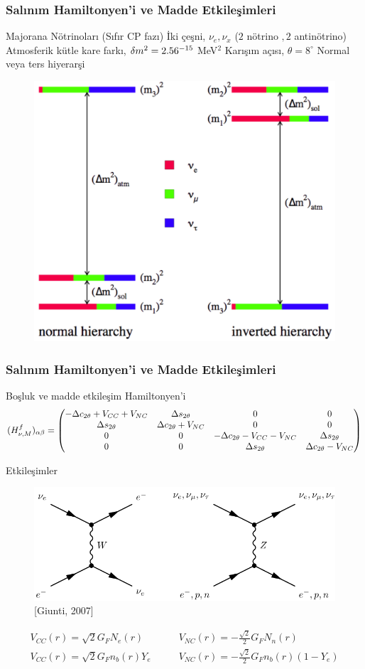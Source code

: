 \documentclass[10pt]{beamer}
\begin{document}
\begin{frame}
    \frametitle{Salınım Hamiltonyen'i ve Madde Etkileşimleri}
    \begin{outline}
        \1[\textbullet] Majorana Nötrinoları (Sıfır CP fazı)
        \1[\textbullet] İki çeşni, $ \nu_{e}, \nu_{x} $ ($2$ nötrino $, 2 $ antinötrino)
        \1[\textbullet] Atmosferik kütle kare farkı, $ \delta m^{2}= 2.56 \time 10^{-15} $ MeV$ ^{2} $
        \1[\textbullet] Karışım açısı, $ \theta=8^{\circ}  $
        \1[\textbullet] Normal veya ters hiyerarşi
    \end{outline}
    \begin{figure}[hbt!]
        \centering
        \includegraphics[width=.45\textwidth]{fig/nuHier.pdf}
    \end{figure}
\end{frame}
\begin{frame}
    \frametitle{Salınım Hamiltonyen'i ve Madde Etkileşimleri}
    Boşluk ve madde etkileşim Hamiltonyen'i
    \tiny
    \begin{align*}
        (H^{f}_{\nu,M})_{\alpha\beta} =\mqty(-\Delta c_{ 2\theta}+V_{CC}+V_{NC} & \Delta s_{ 2\theta} & 0 & 0\\ \Delta s_{ 2\theta} & \Delta c_{ 2\theta}+V_{NC} & 0 & 0 \\0 & 0 & -\Delta c_{ 2\theta}-V_{CC}-V_{NC} & \Delta s_{ 2\theta}\\ 0 & 0 & \Delta s_{ 2\theta} & \Delta c_{ 2\theta}-V_{NC} )
    \end{align*}
    \normalsize
    
    Etkileşimler
    \begin{figure}[hbt!]
        \centering
        \includegraphics[width=.65\textwidth]{fig/matFeynDiag.png}
        {\tiny [Giunti, 2007]}
    \end{figure}
    \begin{align*}
        V_{CC}(r) = \sqrt{2}G_{F}N_{e}(r) \qquad& V_{NC}(r) = -\frac{\sqrt{2}}{2}G_{F}N_{n}(r)\\
        V_{CC}(r) = \sqrt{2}G_{F}n_{b}(r)Y_{e} \qquad& V_{NC}(r) = -\frac{\sqrt{2}}{2}G_{F}n_{b}(r)(1-Y_{e})
    \end{align*}
\end{frame}
\end{document}
